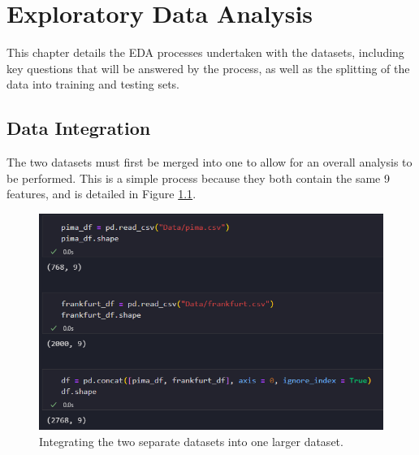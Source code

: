 \documentclass[12pt]{report}
\begin{document}



\chapter{Exploratory Data Analysis}
This chapter details the EDA processes undertaken with the datasets, including 
key questions that will be answered by the process, as well as the splitting of the 
data into training and testing %
sets.

\section{Data Integration}
The two datasets must first be merged into one to allow for an overall analysis to be performed.
This is a simple process because they both contain the same 9 features, and is detailed in Figure 
\ref{fig:Integration}.

\begin{figure}[H]
    \centering
    \includegraphics[width=\linewidth]{Integration.png}
    \caption{Integrating the two separate datasets into one larger dataset.}
    \label{fig:Integration}
\end{figure}
\end{document}
